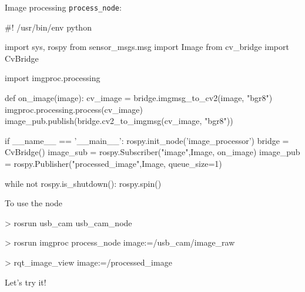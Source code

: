 \documentclass[compress]{beamer}
\begin{document}
\begin{frame}[fragile]{Image processing}
\texttt{process\_node}:
\begin{pythoncode}
#! /usr/bin/env python

import sys, rospy
from sensor_msgs.msg import Image
from cv_bridge import CvBridge

import imgproc.processing

def on_image(image):
    cv_image = bridge.imgmsg_to_cv2(image, "bgr8")
    imgproc.processing.process(cv_image)
    image_pub.publish(bridge.cv2_to_imgmsg(cv_image, "bgr8"))

if __name__ == '__main__':
    rospy.init_node('image_processor')
    bridge = CvBridge()
    image_sub = rospy.Subscriber("image",Image, on_image)
    image_pub = rospy.Publisher("processed_image",Image, queue_size=1)

    while not rospy.is_shutdown():
        rospy.spin()
\end{pythoncode}

\end{frame}

\begin{frame}[fragile]{To use the node}


\begin{shcode}
> rosrun usb_cam usb_cam_node
\end{shcode}


\begin{shcode}
> rosrun imgproc process_node image:=/usb_cam/image_raw
\end{shcode}


\begin{shcode}
> rqt_image_view image:=/processed_image
\end{shcode}

\end{frame}


\begin{frame}[plain]
    \begin{center}
        \Large
    Let's try it!
    \end{center}
\end{frame}
\end{document}
